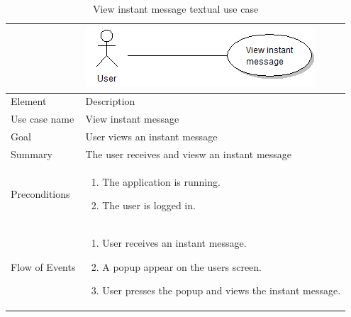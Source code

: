 \begin{table}
\begin{tabular}{p{3cm}p{12cm}}
& \includegraphics{view_instant_message}\\ \hline
Element & Description \\ \hline
Use case name & View instant message \\
Goal & User views an instant message \\
Summary & The user receives and viesw an instant message \\
Preconditions &
\begin{enumerate}
\item{}The application is running.
\item{}The user is logged in.
\end{enumerate} \\ \hline
Flow of Events &
\begin{enumerate}
\item{}User receives an instant message.
\item{}A popup appear on the users screen.
\item{}User presses the popup and views the instant message.
\end{enumerate} \\ \hline
\end{tabular}
\caption{View instant message textual use case} \label{tab:createmessage}
\end{table}

